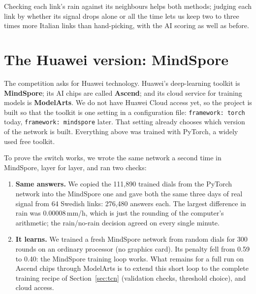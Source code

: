 \begin{oneline}
Checking each link's rain against its neighbours helps both methods; judging each link by whether its signal drops alone or
all the time lets us keep two to three times more Italian links than hand-picking, with the AI scoring as well as before.
\end{oneline}



\section{The Huawei version: MindSpore}
\label{sec:mindspore}

The competition asks for Huawei technology. Huawei's deep-learning toolkit is \textbf{MindSpore}; its AI chips are called
\textbf{Ascend}; and its cloud service for training models is \textbf{ModelArts}. We do not have Huawei Cloud access yet,
so the project is built so that the toolkit is one setting in a configuration file: \texttt{framework: torch} today,
\texttt{framework: mindspore} later. That setting already chooses which version of the network is built. Everything above
was trained with PyTorch, a widely used free toolkit.

To prove the switch works, we wrote the same network a second time in MindSpore, layer for layer, and ran two checks:
\begin{enumerate}
\item \textbf{Same answers.} We copied the 111{,}890 trained dials from the PyTorch network into the MindSpore one and
gave both the same three days of real signal from 64 Swedish links: 276{,}480 answers each. The largest difference in rain
was 0.00008\,mm/h, which is just the rounding of the computer's arithmetic; the rain/no-rain decision agreed on every single
minute.
\item \textbf{It learns.} We trained a fresh MindSpore network from random dials for 300 rounds on an ordinary processor
(no graphics card). Its penalty fell from 0.59 to 0.40: the MindSpore training loop works. What remains for a full run on Ascend
chips through ModelArts is to extend this short loop to the complete training recipe of Section~\ref{sec:tcn}
(validation checks, threshold choice), and cloud access.
\end{enumerate}

